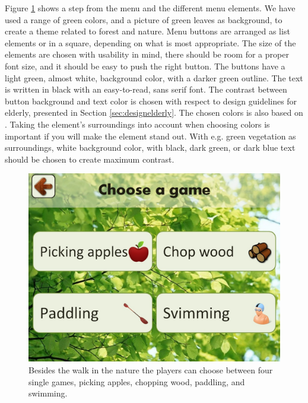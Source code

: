 Figure \ref{fig:velgSpill} shows a step from the menu and the different menu elements. We have used a range of green colors, and a picture of green leaves as background, to create a theme related to forest and nature. Menu buttons are arranged as list elements or in a square, depending on what is most appropriate. The size of the elements are chosen with usability in mind, there should be room for a proper font size, and it should be easy to push the right button. The buttons have a light green, almost white, background color, with a darker green outline. The text is written in black with an easy-to-read, sans serif font. The contrast between button background and text color is chosen with respect to design guidelines for elderly, presented in Section \ref{sec:designelderly}. The chosen colors is also based on \cite{blindeforbundetTekst}. Taking the element's surroundings into account when choosing colors is important if you will make the element stand out. With e.g. green vegetation as surroundings, white background color, with black, dark green, or dark blue text should be chosen to create maximum contrast.   

\begin{figure} [H]
\centering
\includegraphics[scale=0.4]{chooseGame.jpg}
\caption[The four single games]{Besides the walk in the nature the players can choose between four single games, picking apples, chopping wood, paddling, and swimming.}
\label{fig:velgSpill}
\end{figure}

